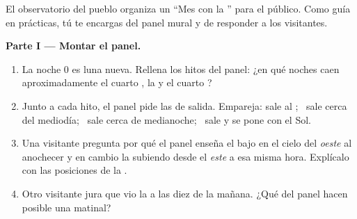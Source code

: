 \begin{problem}\label{pb:g7:moon-phases:1}
El observatorio del pueblo organiza un ``Mes con la '' para el
público. Como guía en prácticas, tú te encargas del panel mural y de
responder a los visitantes.

\medskip\noindent\textbf{Parte I --- Montar el panel.}
\begin{enumerate}
  \item La noche 0 es luna nueva. Rellena los hitos del panel: ¿en
        qué noches caen aproximadamente el cuarto , la
         y el cuarto ?
  \item Junto a cada hito, el panel pide las  de salida.
        Empareja: sale al ; \ sale cerca del mediodía; \ sale
        cerca de medianoche; \ sale y se pone con el Sol.
  \item Una visitante pregunta por qué el panel enseña el
         bajo en el cielo del \emph{oeste} al anochecer y en
        cambio la  subiendo desde el \emph{este} a esa
        misma hora. Explícalo con las posiciones de la .
  \item Otro visitante jura que vio la  a las diez de la
        mañana. ¿Qué  del panel hacen posible una 
        matinal?
\end{enumerate}


\end{problem}
